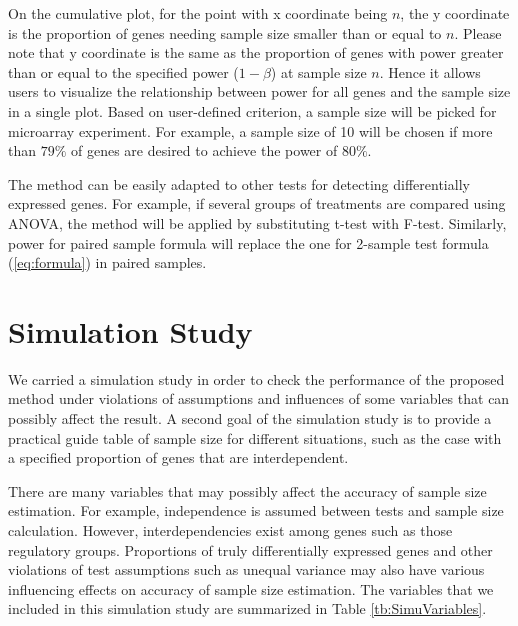 \documentclass{bioinfo}
\begin{document}
On the cumulative plot, for the point with x coordinate being $n$,
the y coordinate is the proportion of genes needing sample size
smaller than or equal to $n$. Please note that y coordinate is the
same as the proportion of genes with power greater than or equal
to the specified power ($1- \beta$) at sample size $n$. Hence it
allows users to visualize the relationship between power for all
genes and the sample size in a single plot. Based on user-defined
criterion, a sample size will be picked for microarray experiment.
For example, a sample size of 10 will be chosen if more than
$79\%$ of genes are desired to achieve the power of $80\%$.

The method can be easily adapted to other tests for detecting
differentially expressed genes. For example, if several groups of
treatments are compared using ANOVA, the method will be applied by
substituting t-test  with F-test. Similarly, power for paired
sample formula will replace the one for 2-sample test formula
(\ref{eq:formula}) in paired samples.


\section{Simulation Study}
We carried a simulation study in order to check the performance of
the proposed method under violations of assumptions and influences
of some variables that can possibly affect the result. A second
goal of the simulation study is to provide a practical guide table
of sample size for different situations, such as the case with a
specified proportion of genes that are interdependent.

There are many variables that may possibly affect the accuracy of
sample size estimation. For example, independence is assumed
between tests and sample size calculation. However,
interdependencies exist among genes such as those regulatory
groups. Proportions of truly differentially expressed genes and
other violations of test assumptions such as unequal variance may
also have various influencing effects on accuracy of sample size
estimation. The variables that we included in this simulation
study are summarized in Table \ref{tb:SimuVariables}.
\end{document}
